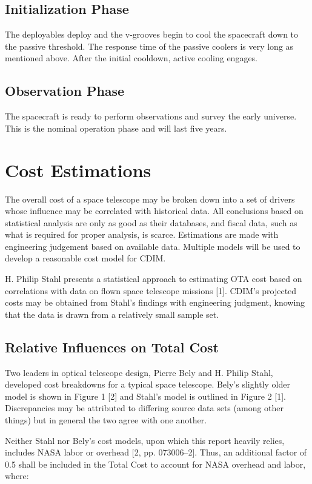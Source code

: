 \documentclass{ws-jai}
\begin{document}
\subsection{Initialization Phase}
\label{sS:initphase}
The deployables deploy and the v-grooves begin to cool the spacecraft down to the passive threshold.
The response time of the passive coolers is very long as mentioned above.
After the initial cooldown, active cooling engages.

\subsection{Observation Phase}
\label{sS:obsphase}
The spacecraft is ready to perform observations and survey the early universe.
This is the nominal operation phase and will last five years.

\section{Cost Estimations}
\label{S:cost}
The overall cost of a space telescope may be broken down into a set of drivers whose influence may be correlated with historical data.
All conclusions based on statistical analysis are only as good as their databases, and fiscal data, such as what is required for proper analysis, is scarce.
Estimations are made with engineering judgement based on available data. Multiple models will be used to develop a reasonable cost model for CDIM.\@

H. Philip Stahl presents a statistical approach to estimating OTA cost based on correlations with data on flown space telescope missions [1].
CDIM's projected costs may be obtained from Stahl's findings with engineering judgment, knowing that the data is drawn from a relatively small sample set.

\subsection{Relative Influences on Total Cost}
Two leaders in optical telescope design, Pierre Bely and H. Philip Stahl, developed cost breakdowns for a typical space telescope.
Bely's slightly older model is shown in Figure 1 [2] and Stahl's model is outlined in Figure 2 [1].
Discrepancies may be attributed to differing source data sets (among other things) but in general the two agree with one another.

Neither Stahl nor Bely's cost models, upon which this report heavily relies, includes NASA labor or overhead [2, pp. 073006--2].
Thus, an additional factor of 0.5 shall be included in the Total Cost to account for NASA overhead and labor, where:
\end{document}
